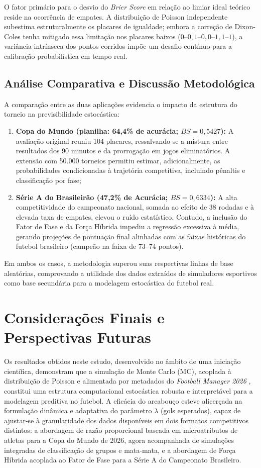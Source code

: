 \documentclass[12pt]{article}
\begin{document}
O fator primário para o desvio do \textit{Brier Score} em relação ao limiar ideal teórico reside na ocorrência de empates. A distribuição de Poisson independente subestima estruturalmente os placares de igualdade; embora a correção de Dixon-Coles tenha mitigado essa limitação nos placares baixos ($0\text{--}0, 1\text{--}0, 0\text{--}1, 1\text{--}1$), a variância intrínseca dos pontos corridos impõe um desafio contínuo para a calibração probabilística em tempo real.

\subsection{Análise Comparativa e Discussão Metodológica}

A comparação entre as duas aplicações evidencia o impacto da estrutura do torneio na previsibilidade estocástica:
\begin{enumerate}
	\item \textbf{Copa do Mundo (planilha: 64,4\% de acurácia; $BS=0{,}5427$):} A avaliação original reuniu 104 placares, ressalvando-se a mistura entre resultados dos 90 minutos e da prorrogação em jogos eliminatórios. A extensão com 50.000 torneios permitiu estimar, adicionalmente, as probabilidades condicionadas à trajetória competitiva, incluindo pênaltis e classificação por fase;
	\item \textbf{Série A do Brasileirão (47,2\% de Acurácia; $BS = 0{,}6334$):} A alta competitividade do campeonato nacional, somada ao efeito de 38 rodadas e à elevada taxa de empates, elevou o ruído estatístico. Contudo, a inclusão do Fator de Fase e da Força Híbrida impediu a regressão excessiva à média, gerando projeções de pontuação final alinhadas com as faixas históricas do futebol brasileiro (campeão na faixa de 73--74 pontos).
\end{enumerate}

Em ambos os casos, a metodologia superou suas respectivas linhas de base aleatórias, comprovando a utilidade dos dados extraídos de simuladores esportivos como base secundária para a modelagem estocástica do futebol real.

\section{Considerações Finais e Perspectivas Futuras}

Os resultados obtidos neste estudo, desenvolvido no âmbito de uma iniciação científica, demonstram que a simulação de Monte Carlo (MC), acoplada à distribuição de Poisson e alimentada por metadados do \textit{Football Manager 2026} \cite{fm2026}, constitui uma estrutura computacional estocástica robusta e interpretável para a modelagem preditiva no futebol. A eficácia do arcabouço esteve alicerçada na formulação dinâmica e adaptativa do parâmetro $\lambda$ (gols esperados), capaz de ajustar-se à granularidade dos dados disponíveis em dois formatos competitivos distintos: a abordagem de razão proporcional baseada em microatributos de atletas para a Copa do Mundo de 2026, agora acompanhada de simulações integradas de classificação de grupos e mata-mata, e a abordagem de Força Híbrida acoplada ao Fator de Fase para a Série A do Campeonato Brasileiro.
\end{document}
